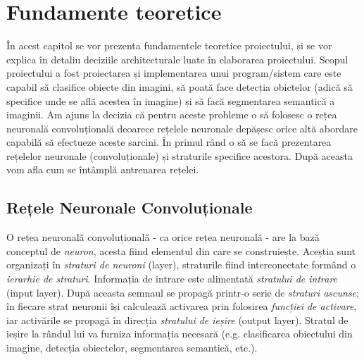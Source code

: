 \chapter{Fundamente teoretice}
În acest capitol se vor prezenta fundamentele teoretice proiectului, și se vor explica în detaliu deciziile architecturale luate în elaborarea proiectului.\newline
Scopul proiectului a fost proiectarea și implementarea unui program/sistem care este capabil să clasifice obiecte din imagini, să poată face detecția obictelor (adică să specifice unde se află acestea în imagine) și să facă segmentarea semantică a imaginii. Am ajuns la decizia că pentru aceste probleme o să folosesc o rețea neuronală convoluțională deoarece rețelele neuronale depășesc orice altă abordare capabilă să efectueze aceste sarcini.\newline
În primul rând o să se facă prezentarea rețelelor neuronale (convoluționale) și straturile specifice acestora. După aceasta vom afla cum se întâmplă antrenarea rețelei.




\section{Rețele Neuronale Convoluționale}
O rețea neuronală convoluțională - ca orice rețea neuronală - are la bază conceptul de \textit{neuron}, acesta fiind elementul din care se construiește. Aceștia sunt organizați în \textit{straturi de neuroni} (layer), straturile fiind interconectate formând o \textit{ierarhie de straturi}.\newline
Informația de intrare este alimentată \textit{stratului de intrare} (input layer). După aceasta semnaul se propagă printr-o serie de \textit{straturi ascunse}; în fiecare strat neuronii își calculează activarea prin folosirea \textit{funcției de activare}, iar activările se propagă în direcția \textit{stratului de ieșire} (output layer). Stratul de ieșire la rândul lui va furniza informația necesară (e.g. clasificarea obiectului din imagine, detecția obiectelor, segmentarea semantică, etc.).




